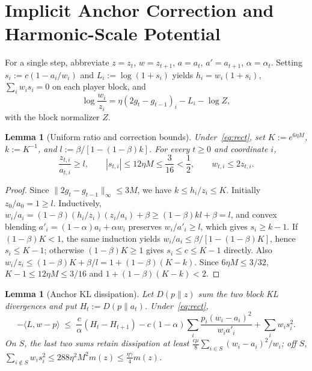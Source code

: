 \documentclass[11pt]{article}
\theoremstyle{plain}
\newtheorem{lemma}[theorem]{Lemma}
\theoremstyle{definition}
\theoremstyle{remark}
\begin{document}
\section{Implicit Anchor Correction and Harmonic-Scale Potential}

For a single step, abbreviate $z = z_t$, $w = z_{t+1}$, $a = a_t$, $a' = a_{t+1}$, $\alpha = \alpha_t$. Setting $s_i := c(1 - a_i/w_i)$ and $L_i := \log(1 + s_i)$ yields $h_i = w_i(1 + s_i)$, $\sum_i w_i s_i = 0$ on each player block, and
\begin{equation}\label{eq:log-step}
\log\frac{w_i}{z_i} = \eta(2g_t - g_{t-1})_i - L_i - \log Z,
\end{equation}
with the block normalizer $Z$.

\begin{lemma}[Uniform ratio and correction bounds]\label{lem:ratios}
Under~\eqref{eq:rect}, set $K := e^{6\eta M}$, $k := K^{-1}$, and $l := \beta/[1 - (1-\beta)k]$. For every $t \ge 0$ and coordinate $i$,
\[
\frac{z_{t,i}}{a_{t,i}} \ge l, \qquad |s_{t,i}| \le 12\eta M \le \frac{3}{16} < \frac{1}{2}, \qquad w_{t,i} \le 2 z_{t,i}.
\]
\end{lemma}

\begin{proof}
Since $\|2g_t - g_{t-1}\|_\infty \le 3M$, we have $k \le h_i/z_i \le K$. Initially $z_0/a_0 = 1 \ge l$. Inductively, $w_i/a_i = (1-\beta)(h_i/z_i)(z_i/a_i) + \beta \ge (1-\beta)kl + \beta = l$, and convex blending $a'_i = (1-\alpha)a_i + \alpha w_i$ preserves $w_i/a'_i \ge l$, which gives $s_i \ge k - 1$. If $(1-\beta)K < 1$, the same induction yields $w_i/a_i \le \beta/[1 - (1-\beta)K]$, hence $s_i \le K - 1$; otherwise $(1-\beta)K \ge 1$ gives $s_i \le c \le K - 1$ directly. Also $w_i/z_i \le (1-\beta)K + \beta/l = 1 + (1-\beta)(K-k)$. Since $6\eta M \le 3/32$, $K - 1 \le 12\eta M \le 3/16$ and $1 + (1-\beta)(K-k) < 2$.
\end{proof}

\begin{lemma}[Anchor KL dissipation]\label{lem:anchor-diss}
Let $D(p \| z)$ sum the two block KL divergences and put $H_t := D(p \| a_t)$. Under~\eqref{eq:rect},
\begin{equation}\label{eq:anchor-diss}
-\langle L, w - p \rangle
\;\le\; \frac{c}{\alpha}(H_t - H_{t+1}) - c(1-\alpha)\sum_i \frac{p_i(w_i - a_i)^2}{w_i a'_i} + \sum_i w_i s_i^2.
\end{equation}
On $S$, the last two sums retain dissipation at least $\frac{c\mu}{8}\sum_{i \in S}(w_i - a_i)^2/w_i$; off $S$, $\sum_{i \notin S} w_i s_i^2 \le 288\eta^2 M^2 m(z) \le \frac{\eta\gamma}{4}m(z)$.
\end{lemma}
\end{document}
